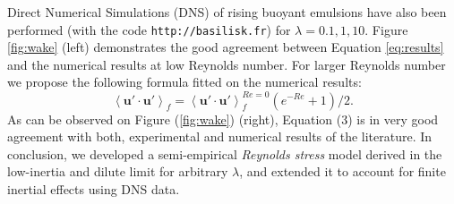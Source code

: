 \documentclass[12pt,a4paper]{article}
\newcommand{\avg}[1]{\left<#1\right>}
\renewcommand{\avg}[1]{\left<#1\right>}
\begin{document}
Direct Numerical Simulations (DNS) of rising buoyant emulsions have also been performed (with the code \texttt{http://basilisk.fr}) for $\lambda = 0.1,1,10$. 
Figure \ref{fig:wake} (left) demonstrates the good agreement between Equation \eqref{eq:results} and the numerical results at low Reynolds number. For larger Reynolds number we propose the following formula fitted on the numerical results: 
\begin{equation}
    \avg{\textbf{u}'\cdot \textbf{u}'}_f
    =
    \avg{\textbf{u}'\cdot \textbf{u}'}_f^{Re = 0}
    \left(e^{-Re} +1\right)/2. 
    \label{eq:semi-emprical}
\end{equation}
As can be observed on Figure (\ref{fig:wake}) (right), Equation (3) is in very good agreement with both, experimental and numerical results of the literature.  
In conclusion, we developed a semi-empirical \textit{Reynolds stress} model derived in the low-inertia and dilute limit for arbitrary $\lambda$, and extended it to account for finite inertial effects using DNS data.

 



\end{document}
